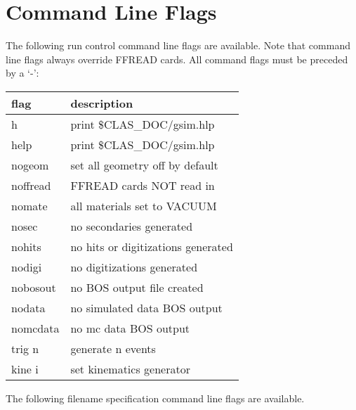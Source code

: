 \documentclass{article}
\begin{document}
\appendix



\newpage
\section{Command Line Flags}
\label{commandline}

The following run control command line flags are available.  Note that
command line flags always override FFREAD cards.  All command flags
must be preceded by a `-':

\par
\begin{center}
\begin{tabular}{|l|l|} \hline
flag     &   description \\ \hline
h        &   print \$CLAS\_DOC/gsim.hlp \\
help     &   print \$CLAS\_DOC/gsim.hlp \\
nogeom   &   set all geometry off by default \\
noffread &   FFREAD cards NOT read in \\
nomate   &   all materials set to VACUUM \\
nosec    &   no secondaries generated \\
nohits   &   no hits or digitizations generated \\
nodigi   &   no digitizations generated \\
nobosout &   no BOS output file created \\
nodata   &   no simulated data BOS output \\
nomcdata &   no mc data BOS output \\
trig n   &   generate n events \\
kine i   &   set kinematics generator \\ \hline
\end{tabular}
\end{center}
\par

\noindent
The following filename specification command line flags are available.
\end{document}
